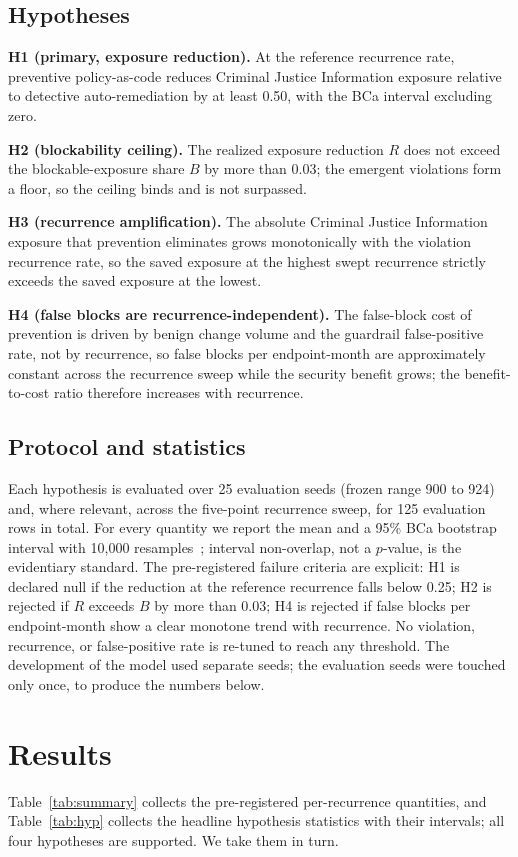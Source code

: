 \documentclass[journal]{IEEEtran}
\begin{document}
\subsection{Hypotheses}
\textbf{H1 (primary, exposure reduction).} At the reference recurrence rate, preventive
policy-as-code reduces Criminal Justice Information exposure relative to detective auto-remediation
by at least 0.50, with the BCa interval excluding zero.

\textbf{H2 (blockability ceiling).} The realized exposure reduction $R$ does not exceed the
blockable-exposure share $B$ by more than 0.03; the emergent violations form a floor, so the ceiling
binds and is not surpassed.

\textbf{H3 (recurrence amplification).} The absolute Criminal Justice Information exposure that
prevention eliminates grows monotonically with the violation recurrence rate, so the saved exposure
at the highest swept recurrence strictly exceeds the saved exposure at the lowest.

\textbf{H4 (false blocks are recurrence-independent).} The false-block cost of prevention is driven
by benign change volume and the guardrail false-positive rate, not by recurrence, so false blocks
per endpoint-month are approximately constant across the recurrence sweep while the security benefit
grows; the benefit-to-cost ratio therefore increases with recurrence.

\subsection{Protocol and statistics}
Each hypothesis is evaluated over 25 evaluation seeds (frozen range 900 to 924) and, where relevant,
across the five-point recurrence sweep, for 125 evaluation rows in total. For every quantity we
report the mean and a 95\% BCa bootstrap interval with 10{,}000
resamples~\cite{efron1987bca,efron1994introduction}; interval non-overlap, not a $p$-value, is the
evidentiary standard. The pre-registered failure criteria are explicit: H1 is declared null if the
reduction at the reference recurrence falls below 0.25; H2 is rejected if $R$ exceeds $B$ by more
than 0.03; H4 is rejected if false blocks per endpoint-month show a clear monotone trend with
recurrence. No violation, recurrence, or false-positive rate is re-tuned to reach any threshold. The
development of the model used separate seeds; the evaluation seeds were touched only once, to
produce the numbers below.

\section{Results}
Table~\ref{tab:summary} collects the pre-registered per-recurrence quantities, and
Table~\ref{tab:hyp} collects the headline hypothesis statistics with their intervals; all four
hypotheses are supported. We take them in turn.
\end{document}

